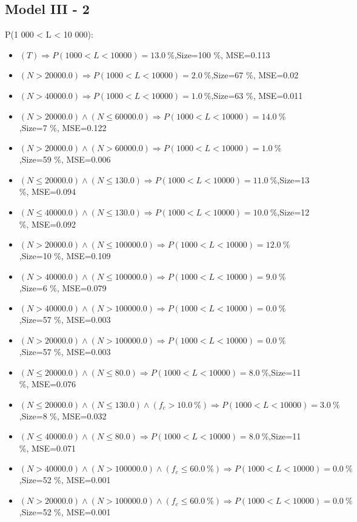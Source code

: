 \documentclass[numbered]{CSL}
\begin{document}
\subsection{Model III - 2}
P(1 000 < L < 10 000):
\begin{itemize}
\item $(T) \Rightarrow P(1 000 < L < 10 000) = 13.0~\%$,\hfill Size=100 \%, MSE=0.113
\item $(N > 20000.0) \Rightarrow P(1 000 < L < 10 000) = 2.0~\%$,\hfill Size=67 \%, MSE=0.02
\item $(N > 40000.0) \Rightarrow P(1 000 < L < 10 000) = 1.0~\%$,\hfill Size=63 \%, MSE=0.011
\item $(N > 20000.0) \land (N \leq 60000.0) \Rightarrow P(1 000 < L < 10 000) = 14.0~\%$,\hfill Size=7 \%, MSE=0.122
\item $(N > 20000.0) \land (N > 60000.0) \Rightarrow P(1 000 < L < 10 000) = 1.0~\%$,\hfill Size=59 \%, MSE=0.006
\item $(N \leq 20000.0) \land (N \leq 130.0) \Rightarrow P(1 000 < L < 10 000) = 11.0~\%$,\hfill Size=13 \%, MSE=0.094
\item $(N \leq 40000.0) \land (N \leq 130.0) \Rightarrow P(1 000 < L < 10 000) = 10.0~\%$,\hfill Size=12 \%, MSE=0.092
\item $(N > 20000.0) \land (N \leq 100000.0) \Rightarrow P(1 000 < L < 10 000) = 12.0~\%$,\hfill Size=10 \%, MSE=0.109
\item $(N > 40000.0) \land (N \leq 100000.0) \Rightarrow P(1 000 < L < 10 000) = 9.0~\%$,\hfill Size=6 \%, MSE=0.079
\item $(N > 40000.0) \land (N > 100000.0) \Rightarrow P(1 000 < L < 10 000) = 0.0~\%$,\hfill Size=57 \%, MSE=0.003
\item $(N > 20000.0) \land (N > 100000.0) \Rightarrow P(1 000 < L < 10 000) = 0.0~\%$,\hfill Size=57 \%, MSE=0.003
\item $(N \leq 20000.0) \land (N \leq 80.0) \Rightarrow P(1 000 < L < 10 000) = 8.0~\%$,\hfill Size=11 \%, MSE=0.076
\item $(N \leq 20000.0) \land (N \leq 130.0) \land (f_c > 10.0~\%) \Rightarrow P(1 000 < L < 10 000) = 3.0~\%$,\hfill Size=8 \%, MSE=0.032
\item $(N \leq 40000.0) \land (N \leq 80.0) \Rightarrow P(1 000 < L < 10 000) = 8.0~\%$,\hfill Size=11 \%, MSE=0.071
\item $(N > 40000.0) \land (N > 100000.0) \land (f_c \leq 60.0~\%) \Rightarrow P(1 000 < L < 10 000) = 0.0~\%$,\hfill Size=52 \%, MSE=0.001
\item $(N > 20000.0) \land (N > 100000.0) \land (f_c \leq 60.0~\%) \Rightarrow P(1 000 < L < 10 000) = 0.0~\%$,\hfill Size=52 \%, MSE=0.001

\end{itemize}
\end{document}
